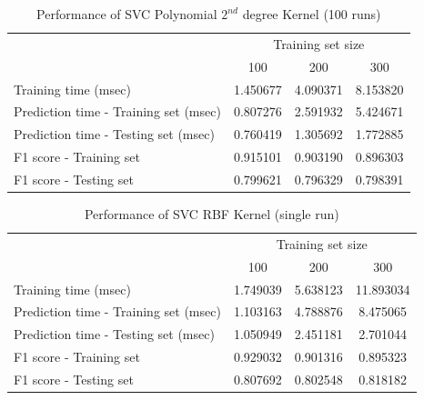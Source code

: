 \documentclass{article}
\begin{document}
	\begin{table}[!ht]
		\centering
		\begin{tabular}{l|ccc}
			\toprule
			{} & \multicolumn{3}{c}{Training set size} \\
			{} &       100 &       200 &       300 \\
			\midrule
			Training time (msec)                  &  1.450677 &  4.090371 &  8.153820 \\
			Prediction time - Training set (msec) &  0.807276 &  2.591932 &  5.424671 \\
			Prediction time - Testing set (msec)  &  0.760419 &  1.305692 &  1.772885 \\
			F1 score - Training set               &  0.915101 &  0.903190 &  0.896303 \\
			F1 score - Testing set                &  0.799621 &  0.796329 &  0.798391 \\
			\bottomrule
		\end{tabular}
		\caption{Performance of SVC Polynomial $2^{nd}$ degree Kernel (100 runs)}
		\label{tab:svc_poly_100}
	\end{table}
	
	\begin{table}[!ht]
		\centering
		\begin{tabular}{l|ccc}
			\toprule
			{} & \multicolumn{3}{c}{Training set size} \\
			{} &       100 &       200 &        300 \\
			\midrule
			Training time (msec)                  &  1.749039 &  5.638123 &  11.893034 \\
			Prediction time - Training set (msec) &  1.103163 &  4.788876 &   8.475065 \\
			Prediction time - Testing set (msec)  &  1.050949 &  2.451181 &   2.701044 \\
			F1 score - Training set               &  0.929032 &  0.901316 &   0.895323 \\
			F1 score - Testing set                &  0.807692 &  0.802548 &   0.818182 \\
			\bottomrule
		\end{tabular}
		\caption{Performance of SVC RBF Kernel (single run)}
		\label{tab:svc_rbf_1}
	\end{table}
	
\end{document}
